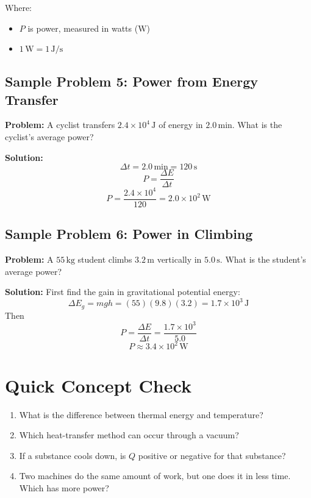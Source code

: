 Where:
\begin{itemize}
    \item $P$ is power, measured in watts ($\text{W}$)
    \item $1\,\text{W} = 1\,\text{J/s}$
\end{itemize}

\subsection*{Sample Problem 5: Power from Energy Transfer}
\textbf{Problem:} A cyclist transfers $2.4 \times 10^4\,\text{J}$ of energy in $2.0\,\text{min}$. What is the cyclist's average power?

\textbf{Solution:}
\begin{equation*}
    \Delta t = 2.0\,\text{min} = 120\,\text{s}
\end{equation*}
\begin{equation*}
    P = \frac{\Delta E}{\Delta t}
\end{equation*}
\begin{equation*}
    P = \frac{2.4 \times 10^4}{120} = 2.0 \times 10^2\,\text{W}
\end{equation*}

\subsection*{Sample Problem 6: Power in Climbing}
\textbf{Problem:} A $55\,\text{kg}$ student climbs $3.2\,\text{m}$ vertically in $5.0\,\text{s}$. What is the student's average power?

\textbf{Solution:}
First find the gain in gravitational potential energy:
\begin{equation*}
    \Delta E_g = mgh = (55)(9.8)(3.2) = 1.7 \times 10^3\,\text{J}
\end{equation*}
Then
\begin{equation*}
    P = \frac{\Delta E}{\Delta t} = \frac{1.7 \times 10^3}{5.0}
\end{equation*}
\begin{equation*}
    P \approx 3.4 \times 10^2\,\text{W}
\end{equation*}

\section{Quick Concept Check}
\begin{enumerate}
    \item What is the difference between thermal energy and temperature?
    \item Which heat-transfer method can occur through a vacuum?
    \item If a substance cools down, is $Q$ positive or negative for that substance?
    \item Two machines do the same amount of work, but one does it in less time. Which has more power?
\end{enumerate}

